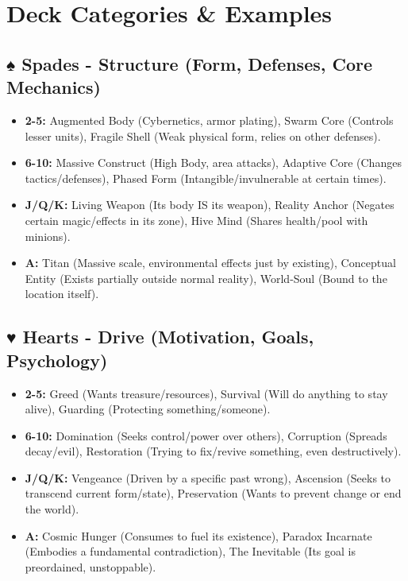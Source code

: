 \section{Deck Categories \& Examples}

\subsection{♠ Spades - Structure (Form, Defenses, Core Mechanics)}

\begin{itemize}
    \item \textbf{2-5:} Augmented Body (Cybernetics, armor plating), Swarm Core (Controls lesser units), Fragile Shell (Weak physical form, relies on other defenses).
    \item \textbf{6-10:} Massive Construct (High Body, area attacks), Adaptive Core (Changes tactics/defenses), Phased Form (Intangible/invulnerable at certain times).
    \item \textbf{J/Q/K:} Living Weapon (Its body IS its weapon), Reality Anchor (Negates certain magic/effects in its zone), Hive Mind (Shares health/pool with minions).
    \item \textbf{A:} Titan (Massive scale, environmental effects just by existing), Conceptual Entity (Exists partially outside normal reality), World-Soul (Bound to the location itself).
\end{itemize}

\subsection{♥ Hearts - Drive (Motivation, Goals, Psychology)}

\begin{itemize}
    \item \textbf{2-5:} Greed (Wants treasure/resources), Survival (Will do anything to stay alive), Guarding (Protecting something/someone).
    \item \textbf{6-10:} Domination (Seeks control/power over others), Corruption (Spreads decay/evil), Restoration (Trying to fix/revive something, even destructively).
    \item \textbf{J/Q/K:} Vengeance (Driven by a specific past wrong), Ascension (Seeks to transcend current form/state), Preservation (Wants to prevent change or end the world).
    \item \textbf{A:} Cosmic Hunger (Consumes to fuel its existence), Paradox Incarnate (Embodies a fundamental contradiction), The Inevitable (Its goal is preordained, unstoppable).
\end{itemize}

